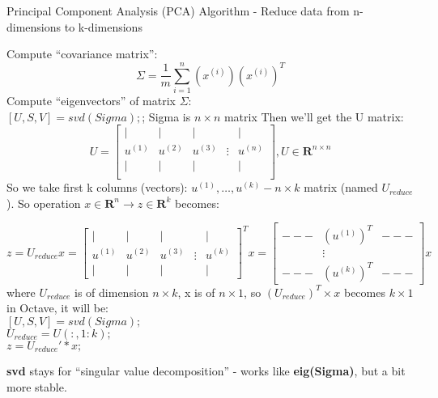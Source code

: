 \documentclass{scrartcl}
\begin{document}
\begin{algorithm}
  \caption{Principal Component Analysis (PCA) Algorithm - Reduce data
    from n-dimensions to k-dimensions }
  \begin{algorithmic}
    \STATE Compute ``covariance matrix'': \[ \Sigma = \frac{1}{m} \sum
    \limits_{i=1}^{n} (x^{(i)})(x^{(i)})^T \]
    \STATE Compute ``eigenvectors'' of matrix $\Sigma$: \\
    $\left[U, S, V\right] = svd(Sigma);$; Sigma is $n \times n$ matrix
    Then we'll get the U matrix: \[U = \left[
      \begin{array}{ccccc}
        | & | & | & & | \\
        u^{(1)} & u^{(2)} & u^{(3)} & \vdots & u^{(n)} \\
        | & | & | & & | \\
      \end{array}
    \right], U \in \mathbf{R}^{n \times n}\] \STATE So we take first k
    columns (vectors): $u^{(1)}, \dots, u^{(k)} - n \times k$ matrix
    (named $U_{reduce}$). So operation $x \in \mathbf{R}^n \rightarrow
    z \in \mathbf{R}^k$ becomes:

    \[ z = U_{reduce} x = \left[
      \begin{array}{ccccc}
        | & | & | & & | \\
        u^{(1)} & u^{(2)} & u^{(3)} & \vdots & u^{(k)} \\
        | & | & | & & | 
      \end{array}
    \right]^T x = \left[
      \begin{array}{ccc}
        --- & (u^{(1)})^T & --- \\
        \   & \vdots & \   \\
        --- & (u^{(k)})^T & --- 
      \end{array}
    \right] x
    \]
    where $U_{reduce}$ is of dimension $n \times k$, x is of $n \times
    1$, so $(U_{reduce})^T \times x$ becomes $k \times 1$
    \STATE in Octave, it will be: \\
    \quad $\left[U, S, V\right] = svd(Sigma);$ \\
    \quad $U_{reduce} = U(:, 1: k);$ \\
    \quad $z = U_{reduce}' * x;$
  \end{algorithmic}
\end{algorithm}

{\bf svd} stays for ``singular value decomposition'' - works like {\bf
  eig(Sigma)}, but a bit more stable.
\end{document}
